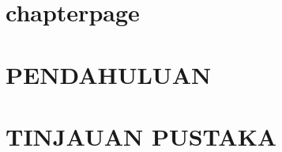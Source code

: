 \documentclass[12pt, a4paper, onecolumn, oneside, final]{report}
\theoremstyle{definition}
\numberwithin{equation}{chapter}
\begin{document}
%
\newpage
\makeatother
{}
\assignpagestyle\chapter{chapterpage}
\setcounter{page}{1}
\pagestyle{myPS}
\def\thechapter{\Roman{chapter}} 
\def\thesection{\arabic{chapter}.\arabic{section}}
\def\thesubsection{\arabic{chapter}.\arabic{section}.\arabic{subsection}}
\def\theequation{\arabic{chapter}.\arabic{equation}}
\def\thefigure{\arabic{chapter}.\arabic{figure}}
\def\thetable{\arabic{chapter}.\arabic{table}}
\chapter{PENDAHULUAN}

\chapter{TINJAUAN PUSTAKA}

\end{document}
